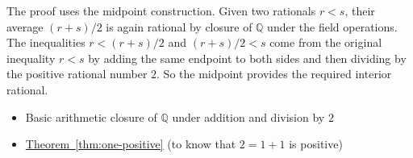 \begin{remark*}
The proof uses the midpoint construction.  Given two rationals $r<s$, their
average $(r+s)/2$ is again rational by closure of $\mathbb{Q}$ under the
field operations.  The inequalities $r<(r+s)/2$ and $(r+s)/2<s$ come from the
original inequality $r<s$ by adding the same endpoint to both sides and then
dividing by the positive rational number $2$.  So the midpoint provides the
required interior rational.
\end{remark*}

\begin{dependencies}
\begin{itemize}
  \item Basic arithmetic closure of $\mathbb{Q}$ under addition and division by $2$
  \item \hyperref[thm:one-positive]{Theorem~\ref*{thm:one-positive}}
        \textnormal{(to know that $2=1+1$ is positive)}
\end{itemize}
\end{dependencies}

\clearpage
